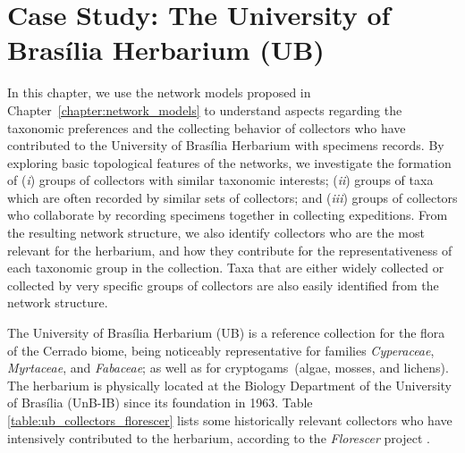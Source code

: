 \chapter{Case Study: The University of Brasília Herbarium (UB)}\label{casestudy_ub}


In this chapter, we use the network models proposed in Chapter~\ref{chapter:network_models} to understand aspects regarding the taxonomic preferences and the collecting behavior of collectors who have contributed to the University of Brasília Herbarium with specimens records.
By exploring basic topological features of the networks, we investigate the formation of
(\textit{i}) groups of collectors with similar taxonomic interests;
(\textit{ii}) groups of taxa which are often recorded by similar sets of collectors; and
(\textit{iii}) groups of collectors who collaborate by recording specimens together in collecting expeditions. 
From the resulting network structure, we also identify collectors who are the most relevant for the herbarium, and how they contribute for the representativeness of each taxonomic group in the collection.
Taxa that are either widely collected or collected by very specific groups of collectors are also easily identified from the network structure.

The University of Brasília Herbarium (UB) is a reference collection for the flora of the Cerrado biome, being noticeably representative for families \textit{Cyperaceae}, \textit{Myrtaceae}, and \textit{Fabaceae}; as well as for cryptogams~(algae, mosses, and lichens).
%
The herbarium is physically located at the Biology Department of the University of Brasília (UnB-IB) since its foundation in 1963.
Table \ref{table:ub_collectors_florescer} lists some historically relevant collectors who have intensively contributed to the herbarium, according to the \textit{Florescer} project \cite{florescer}.


